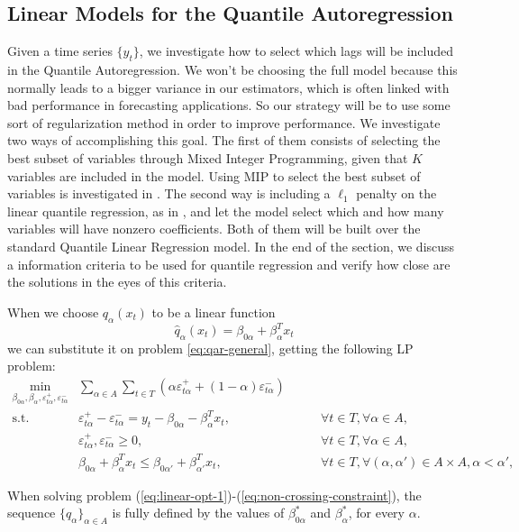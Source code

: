 \subsection{Linear Models for the Quantile Autoregression}
\label{sec:linear-models}

Given a time series $\{y_t\}$, we investigate how to select which lags will be included in the Quantile Autoregression. We won't be choosing the full model because this normally leads to a bigger variance in our estimators, which is often linked with bad performance in forecasting applications. So our strategy will be to use some sort of regularization method in order to improve performance.
We investigate two ways of accomplishing this goal.
The first of them consists of selecting the best subset of variables through Mixed Integer Programming, given that $K$ variables are included in the model. Using MIP to select the best subset of variables is investigated in \cite{bertsimas2015best}. The second way is including a $\ell_1$ penalty on the linear quantile regression, as in \cite{kim2009ell_1}, and let the model select which and how many variables will have nonzero coefficients. 
Both of them will be built over the standard Quantile Linear Regression model. In the end of the section, we discuss a information criteria to be used for quantile regression and verify how close are the solutions in the eyes of this criteria.

When we choose $q_\alpha(x_t)$ to be a linear function
\begin{equation}
\hat{q}_\alpha(x_t) = \beta_{0\alpha} + \beta_\alpha^T x_t
\end{equation}
we can substitute it on problem \ref{eq:qar-general}, getting the following LP problem:
\begin{eqnarray}
\label{eq:non-crossing-quantiles1par}
\min_{\beta_{0\alpha},\beta_\alpha,\varepsilon_{t\alpha}^{+}, \varepsilon_{t\alpha}^{-}} &  \sum_{\alpha \in A} \sum_{t \in T}\left(\alpha \varepsilon_{t \alpha}^{+}+(1-\alpha)\varepsilon_{t \alpha}^{-}\right) & \label{eq:linear-opt-1} \\
\mbox{s.t. } & \varepsilon_{t \alpha}^{+}-\varepsilon_{t \alpha}^{-}=y_{t} - \beta_{0\alpha} - \beta_{\alpha}^T x_{t}, & \qquad\forall t \in T,\forall \alpha \in A,\\
& \varepsilon_{t\alpha}^+,\varepsilon_{t\alpha}^- \geq 0, & \qquad\forall t \in T,\forall \alpha \in A,\\ \label{eq:non-crossing-constraintpar}
& \beta_{0\alpha} + \beta_{\alpha}^T x_{t} \leq \beta_{0\alpha'} + \beta_{\alpha'}^T x_{t}, & \qquad \forall t \in T, \forall (\alpha, \alpha') \in A \times A,  \alpha < \alpha', 
\end{eqnarray}


When solving problem (\ref{eq:linear-opt-1})-(\ref{eq:non-crossing-constraint}), the sequence $\{ q_\alpha \}_{\alpha \in A}$ is fully defined by the values of $\beta^*_{0\alpha}$ and $\beta^*_\alpha$, for every $\alpha$.



